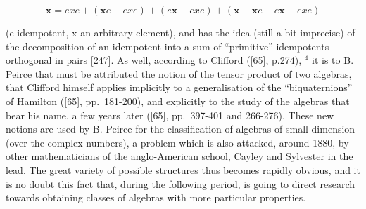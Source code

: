 \[
\boldsymbol {x} = e x e + (\boldsymbol {x} e - e x e) + (e \boldsymbol {x} - e x e) + (\boldsymbol {x} - \boldsymbol {x} e - e \boldsymbol {x} + e x e)
\]

(e idempotent, x an arbitrary element), and has the idea (still a bit imprecise) of the decomposition of an idempotent into a sum of ``primitive'' idempotents orthogonal in pairs {[}247{]}. As well, according to Clifford ({[}65{]}, p.274), \(^{4}\) it is to B. Peirce that must be attributed the notion of the tensor product of two algebras, that Clifford himself applies implicitly to a generalisation of the ``biquaternions'' of Hamilton ({[}65{]}, pp.~181-200), and explicitly to the study of the algebras that bear his name, a few years later ({[}65{]}, pp.~397-401 and 266-276). These new notions are used by B. Peirce for the classification of algebras of small dimension (over the complex numbers), a problem which is also attacked, around 1880, by other mathematicians of the anglo-American school, Cayley and Sylvester in the lead. The great variety of possible structures thus becomes rapidly obvious, and it is no doubt this fact that, during the following period, is going to direct research towards obtaining classes of algebras with more particular properties.

